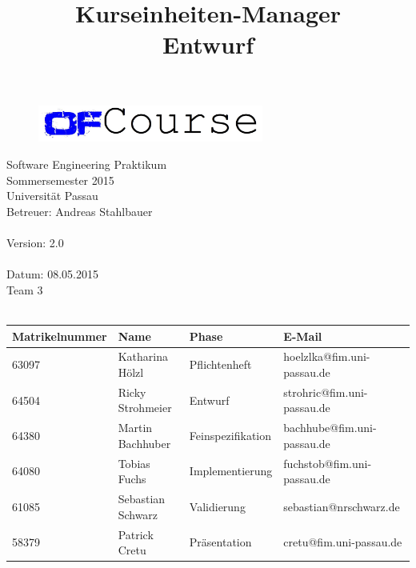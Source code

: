 \documentclass[a4paper, 12pt]{scrreprt}
\begin{document}
	\thispagestyle{plain}

\begin{titlepage}
    \begin{center}
        
        \begin{figure}[ht]
        	\centering
        	\includegraphics[width=0.66\textwidth, angle=0]{logo/name_blau_ofCourse.jpg}
        \end{figure}
        
    	\begin{title}
        	\title{\Huge{\textbf{Kurseinheiten-Manager \\ Entwurf\\}}}

		\end{title}
		\hspace{3cm}

        	Software Engineering Praktikum \\
        	Sommersemester 2015\\
        	Universität Passau\\


        	Betreuer: Andreas Stahlbauer \\
        	\hspace{1,5cm}\\
        	Version: 2.0 \\
        	\hspace{1,5cm}\\
        	Datum: 08.05.2015\\[50pt]
        	Team 3 \\
    
		    \ \\
        
        
        \begin{tabular}{ | l | l | l | l |}
            \hline
             \textbf{Matrikelnummer} & \textbf{Name} & \textbf{Phase} & \textbf{E-Mail}  \\ \hline
             63097 & Katharina Hölzl & Pflichtenheft & hoelzlka@fim.uni-passau.de \\ \hline
             64504 & Ricky Strohmeier& Entwurf & strohric@fim.uni-passau.de  \\ \hline
             64380 & Martin Bachhuber & Feinspezifikation  & bachhube@fim.uni-passau.de \\ \hline
             64080 & Tobias Fuchs & Implementierung  &  fuchstob@fim.uni-passau.de\\ \hline
             61085 & Sebastian Schwarz & Validierung & sebastian@nrschwarz.de \\ \hline  
             58379 & Patrick Cretu  &  Präsentation & cretu@fim.uni-passau.de \\ \hline
        \end{tabular}
    \end{center}
\end{titlepage}



\tableofcontents








\end{document}
